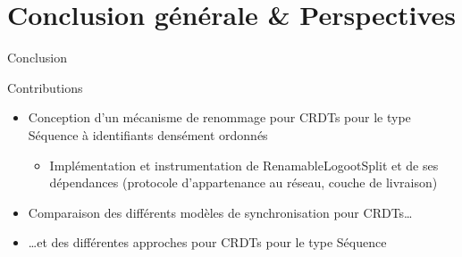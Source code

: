\section{Conclusion générale \& Perspectives}

\begin{frame}{Conclusion}
  \begin{block}{Contributions}
    \begin{itemize}
      \item Conception d'un mécanisme de renommage pour CRDTs pour le type Séquence à identifiants densément ordonnés
      \begin{itemize}
        \item Implémentation et instrumentation de RenamableLogootSplit et de ses dépendances (protocole d'appartenance au réseau, couche de livraison)
      \end{itemize}
      \pause
      \item Comparaison des différents modèles de synchronisation pour CRDTs\dots
      \item \dots et des différentes approches pour CRDTs pour le type Séquence
    \end{itemize}
  \end{block}
\end{frame}

